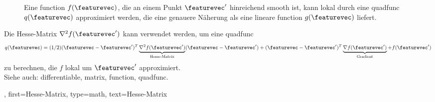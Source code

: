{{\begin{figure}[H]
\begin{center}
		\vspace*{-5mm}
	\end{center}
	\caption{
		Eine \gls{function} $f(\featurevec)$, die an einem Punkt $\featurevec'$ hinreichend 
		\gls{smooth} ist, kann lokal durch eine \gls{quadfunc} $q(\featurevec)$ approximiert werden, 
		die eine genauere Näherung als eine lineare \gls{function} $g(\featurevec)$ liefert. 
		\label{fig_quadapprox_hessian_dict}}
\end{figure}
		Die Hesse-Matrix $\nabla^2 f(\featurevec')$ kann verwendet werden, um eine 
		\gls{quadfunc}
		$$q(\featurevec) = (1/2) (\featurevec- \featurevec')^{T} \underbrace{\nabla^2 f(\featurevec')}_{\text{Hesse-Matrix}} 
		(\featurevec- \featurevec') +  (\featurevec- \featurevec')^{T} \underbrace{\nabla f(\featurevec')}_{\text{Gradient}} 
		+ f(\featurevec')$$
		zu berechnen, die $f$ lokal um $\featurevec'$ approximiert.\cite{MathematikOnline_HesseMatrix}
        		\\
		Siehe auch: \gls{differentiable}, \gls{matrix}, \gls{function}, \gls{quadfunc}. }, 
	first={Hesse-Matrix},
	type=math,
	text={Hesse-Matrix}
}

